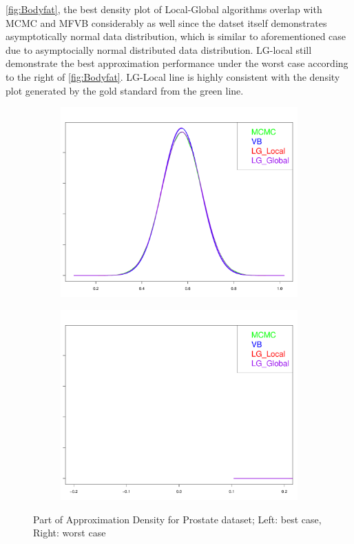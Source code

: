 \autoref{fig:Bodyfat}, the best density plot of Local-Global algorithms overlap with MCMC and MFVB considerably as well since the datset itself demonstrates asymptotically normal data distribution, which is similar to aforementioned case due to asymptocially normal distributed data distribution. LG-local still demonstrate the best approximation performance under the worst case according to the right of \autoref{fig:Bodyfat}. LG-Local line is highly consistent with the density plot generated by the gold standard from the green line.


\begin{figure}[h]
	\begin{subfigure}{0.5\textwidth}
		\centering
		\includegraphics[page = 1, width=\linewidth,keepaspectratio]{lasso_densities_prostate.pdf}
	\end{subfigure}
	\begin{subfigure}{0.5\textwidth}
		\includegraphics[page = 7, width=\linewidth,keepaspectratio]{lasso_densities_prostate-1.pdf}
	\end{subfigure}
	\caption{Part of Approximation Density for Prostate dataset; Left: best case, Right: worst case}
	\label{fig:Prostate}
\end{figure}

